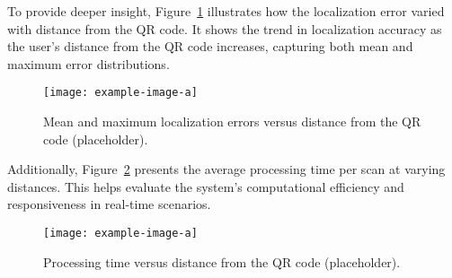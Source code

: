 To provide deeper insight, Figure~\ref{fig:error_distribution} illustrates how the localization error varied with distance from the QR code. It shows the trend in localization accuracy as the user’s distance from the QR code increases, capturing both mean and maximum error distributions.

\begin{figure}[h]
	\centering
	\texttt{[image: example-image-a]}
	\caption{Mean and maximum localization errors versus distance from the QR code (placeholder).}
	\label{fig:error_distribution}
\end{figure}

Additionally, Figure~\ref{fig:processing_time_trend} presents the average processing time per scan at varying distances. This helps evaluate the system’s computational efficiency and responsiveness in real-time scenarios.

\begin{figure}[h]
	\centering
	\texttt{[image: example-image-a]}
	\caption{Processing time versus distance from the QR code (placeholder).}
	\label{fig:processing_time_trend}
\end{figure}
